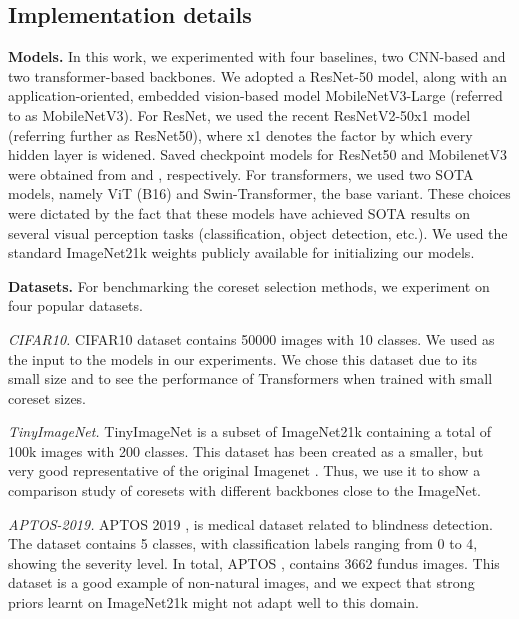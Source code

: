 \subsection{Implementation details}

\textbf{Models. }In this work, we experimented with four baselines, two CNN-based and two transformer-based backbones. We adopted a ResNet-50 model, along with an application-oriented, embedded vision-based model MobileNetV3-Large (referred to as MobileNetV3). For ResNet, we used the recent ResNetV2-50x1 model (referring further as ResNet50), where x1 denotes the factor by which every hidden layer is widened. Saved checkpoint models for ResNet50 and MobilenetV3 were obtained from \cite{kolesnikov2020big} and \cite{rw2019timm}, respectively. For transformers, we used two SOTA models, namely ViT (B16) and Swin-Transformer, the base variant. These choices were dictated by the fact that these models have achieved SOTA results on several visual perception tasks (classification, object detection, etc.). We used the standard ImageNet21k weights publicly available for initializing our models.    










\textbf{Datasets. }For benchmarking the coreset selection methods, we experiment on four popular datasets. 


\textit{CIFAR10. } CIFAR10 \citep{krizhevsky2009learning} dataset contains 50000 images with 10 classes. We used  as the input to the models in our experiments. We chose this dataset due to its small size and to see the performance of Transformers when trained with small coreset sizes.

\textit{TinyImageNet. } TinyImageNet \citep{wu2017tiny} is a subset of ImageNet21k containing a total of 100k images with 200 classes. This dataset has been created as a smaller, but very good representative of the original Imagenet \cite{russakovsky2015imagenet}. Thus, we use it to show a comparison study of coresets with different backbones close to the ImageNet. 

\textit{APTOS-2019.} APTOS 2019 \citep{aptos2019-blindness-detection}, is medical dataset related to blindness detection. The dataset contains 5 classes, with classification labels ranging from 0 to 4, showing the severity level. In total, APTOS \citep{aptos2019-blindness-detection}, contains 3662 fundus images. This dataset is a good example of non-natural images, and we expect that strong priors learnt on ImageNet21k might not adapt well to this domain.


